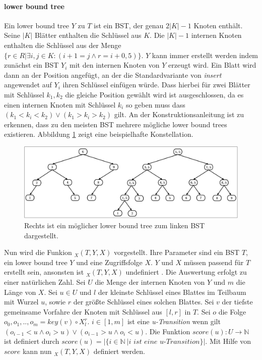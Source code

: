 \documentclass[a4paper,12pt]{article}
\begin{document}
\paragraph{lower bound tree} \label{wilberLowerBoundTree}
Ein lower bound tree $Y$ zu $T$ ist ein BST, der genau $2 \vert K\vert  - 1$ Knoten enthält. Seine $\vert K \vert$ Blätter enthalten die Schlüssel aus $K$. Die $\vert K \vert - 1$ internen Knoten enthalten die Schlüssel aus der Menge $\{r \in R \vert \exists i,j \in K \colon \left( i + 1 = j \land r = i + 0,5\right)\}$. $Y$ kann immer erstellt werden indem zunächst ein BST $Y_i$ mit den internen Knoten von $Y$ erzeugt wird. Ein Blatt wird dann an der Position angefügt, an der die Standardvariante von \textit{insert} angewendet auf $Y_i$ ihren Schlüssel einfügen würde. Dass hierbei für zwei Blätter mit Schlüssel $k_1, k_2$ die gleiche Position gewählt wird ist ausgeschlossen, da es einen internen Knoten mit Schlüssel $k_i$ so geben muss dass $\left(k_1 < k_i < k_2\right) \lor \left(k_1 > k_i > k_2 \right)$ gilt. An der Konstruktionsanleitung ist zu erkennen, dass zu den meisten BST mehrere mögliche lower bound trees existieren. Abbildung \ref{fig:lowerBoundTree} zeigt eine beispielhafte Konstellation. \\



\begin{figure}[h]
	\centering
	\includegraphics[width=1\textwidth]{"Medien/DynOpt/lowerBoundTree"}
	\caption{Rechts ist ein möglicher lower bound tree zum linken BST dargestellt.  }
	\label{fig:lowerBoundTree}
\end{figure}

\noindent Nun wird die Funkion $_X(T, Y, X) $ vorgestellt. Ihre Parameter sind ein BST $T$, ein lower bound tree $Y$ und eine Zugriffsfolge $X$. $Y$ und $X$ müssen passend für $T$ erstellt sein, ansonsten ist $_X(T, Y, X) $ undefiniert . Die Auswertung erfolgt zu einer natürlichen Zahl. Sei $U$ die Menge der internen Knoten von $Y$ und $m$ die Länge von $X$. Sei $u \in U$ und $l$ der kleinste Schlüssel eines Blattes im Teilbaum mit Wurzel $u$, sowie $r$ der größte Schlüssel eines solchen Blattes. Sei $v$ der tiefste gemeinsame Vorfahre der Knoten mit Schlüssel aus $\left[l, r\right]$  in $T$. Sei $o$ die Folge $o_0, o_1,..,o_m =  \mathit{key}(v) \circ X^r_l$. $i \in \left[1,m\right]$ ist eine \textit{u-Transition} wenn gilt $\left( o_{i-1} < u \land o_i > u \right) \lor \left( o_{i-1} > u \land o_i < u \right)$. Die Funktion $\mathit{score}\left(u\right) \colon U \rightarrow \mathbb{N}$ ist definiert durch $\mathit{score}\left(u\right) = \vert\{i \in \mathbb{N}\ \vert \textit{i ist eine u-Transition}\} \vert$. Mit Hilfe von $\mathit{score}$ kann nun  $_X(T, Y, X) $ definiert werden.
\end{document}
